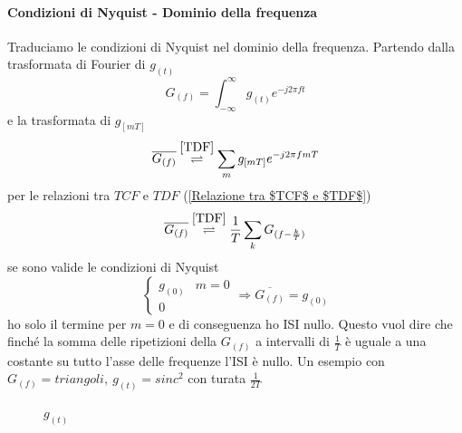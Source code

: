             \paragraph{Condizioni di Nyquist - Dominio della frequenza} Traduciamo le condizioni di Nyquist nel dominio della frequenza. Partendo
            dalla trasformata di Fourier di $g_{(t)}$
            \[
                G_{(f)} =\int_{-\infty}^{\infty}g_{(t)}e^{-j2\pi ft}    
            \]
            e la trasformata di $g_{[mT]}$
            \[
                \overline{G_{(f)}} \overset{\ref{TDF}}{\rightleftharpoons}\sum_{m}g_{[mT]}e^{-j2\pi fmT}    
            \]
            per le relazioni tra $TCF$ e $TDF$ (\ref{Relazione tra $TCF$ e $TDF$})
            \[
                \overline{G_{(f)}} \overset{\ref{TDF}}{\rightleftharpoons}\frac{1}{T}\sum_{k}G_{(f-\frac{k}{T})}    
            \]
            se sono valide le condizioni di Nyquist
            \[
                \begin{cases}
                    g_{(0)} & m=0\nonumber \\
                    0 &\nonumber
                \end{cases}  \Rightarrow \overline{G_{(f)}} = g_{(0)} 
            \]
            ho solo il termine per $m=0$ e di conseguenza ho ISI nullo. Questo vuol dire che finché la somma delle ripetizioni
            della $G_{(f)}$ a intervalli di $\frac{1}{T}$ è uguale a una costante su tutto l'asse delle frequenze l'ISI è nullo.
            Un esempio con $G_{(f)} = triangoli,\ g_{(t)} = sinc^2$ con turata $\frac{1}{2T}$
            \begin{figure}[H]
                \centering
                    \caption{$g_{(t)}$}          
            \end{figure}

